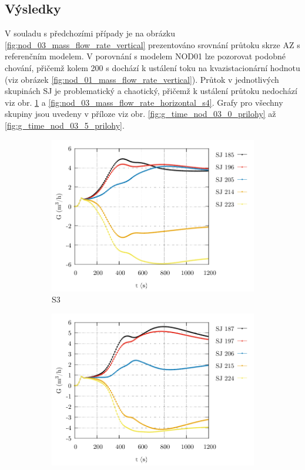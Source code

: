  \subsection{Výsledky}
V souladu s předchozími případy je na obrázku \ref{fig:nod_03_mass_flow_rate_vertical} prezentováno srovnání průtoku skrze AZ s referenčním modelem. V porovnání s modelem NOD01 lze pozorovat podobné chování, přičemž kolem 200 s dochází k ustálení toku na kvazistacionární hodnotu (viz obrázek \ref{fig:nod_01_mass_flow_rate_vertical}). Průtok v jednotlivých skupinách SJ je problematický a chaotický, přičemž k ustálení průtoku nedochází viz obr. \ref{fig:nod_03_mass_flow_rate_horizontal_s3} a \ref{fig:nod_03_mass_flow_rate_horizontal_s4}. Grafy pro všechny skupiny jsou uvedeny v příloze viz obr. \ref{fig:g_time_nod_03_0_prilohy} až \ref{fig:g_time_nod_03_5_prilohy}.
\begin{figure}[H]
	\centering
	\begin{subfigure}{0.5\textwidth}
		\centering
		\includegraphics[width=\textwidth, trim={0cm 0cm 0cm 0cm}, clip]{./05_TH_model_VR_1/grafy/G_time_nod_03_2.pdf}
		\caption{S3}
		\label{fig:nod_03_mass_flow_rate_horizontal_s3}
	\end{subfigure}%
	\hfill
	\begin{subfigure}{0.5\textwidth}
		\centering
		\includegraphics[width=\textwidth, trim={0cm 0cm 0cm 0cm}, clip]{./05_TH_model_VR_1/grafy/G_time_nod_03_3.pdf}

\end{subfigure}
\end{figure}
